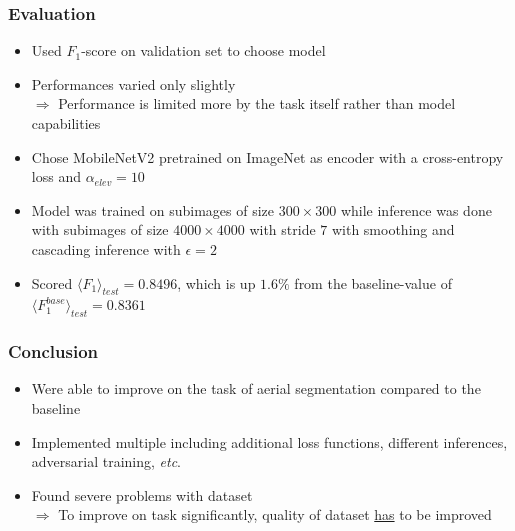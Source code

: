 \documentclass{beamer}
\begin{document}
\begin{frame}
\frametitle{Evaluation}
\begin{itemize}
\item Used $F_1$-score on validation set to choose model
\item Performances varied only slightly\\
$\Rightarrow$ Performance is limited more by the task itself rather than model capabilities
\item Chose MobileNetV2 pretrained on ImageNet as encoder with a cross-entropy loss and $\alpha_{elev} = 10$
\item Model was trained on subimages of size $300 \times 300$ while inference was done with subimages of size $4000 \times 4000$ with stride $7$ with smoothing and cascading inference with $\epsilon = 2$
\item Scored $\langle F_1 \rangle_{test} = 0.8496$, which is up $1.6\%$ from the baseline-value of $\langle F_1^{base} \rangle_{test} = 0.8361$
\end{itemize}
\end{frame}

\begin{frame}
\frametitle{Conclusion}
\begin{itemize}
\item Were able to improve on the task of aerial segmentation compared to the baseline
\item Implemented multiple including additional loss functions, different inferences, adversarial training, \textit{etc}.
\item Found severe problems with dataset\\
$\Rightarrow$ To improve on task significantly, quality of dataset \underline{has} to be improved
\end{itemize}
\end{frame}
\end{document}
